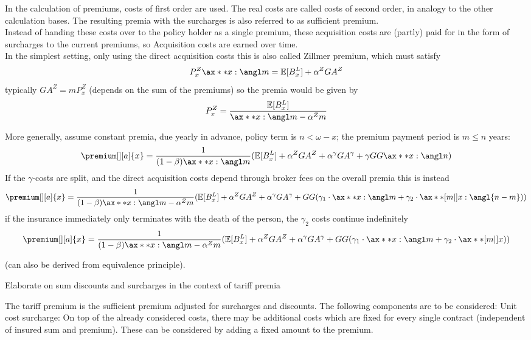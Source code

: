 \documentclass[11pt,a4paper,twoside]{article}
\begin{document}
In the calculation of premiums, costs of first order are used. The real costs are called
costs of second order, in analogy to the other calculation bases.
The resulting premia with the surcharges is also referred to as sufficient premium. \\

Instead of handing these costs over to the policy holder as a single premium, these
acquisition costs are (partly) paid for in the form of surcharges to the current premiums,
so Acquisition costs are earned over time. \\

In the simplest setting, only using the direct acquisition costs this is also called Zillmer premium,
which must satisfy
\[ P^Z_x \ax**{x: \angl m} = \mathbb{E}[B^L_x] + \alpha^Z GA^Z  \]
typically \( GA^Z = m P_x^Z \) (depends on the sum of the premiums) so the premia would be given by
\[ P^Z_x = \frac{\mathbb{E}[B^L_x]}{\ax**{x: \angl m} - \alpha^Z m} \]

More generally, assume constant premia, 
due yearly in advance, 
policy term is \( n < \omega - x\); 
the premium payment period is \( m \leq n \) years:
\[ 
\premium[][a]{x} = \frac{1}{(1 - \beta) \ax**{x: \angl m}}( \mathbb{E}[B^L_x] + \alpha^Z GA^Z + \alpha^\gamma GA^\gamma + \gamma GG \ax**{x: \angl n}) 
\]
If the \( \gamma \)-costs are split, and the direct acquisition costs depend through broker fees on the overall premia this is instead 
\[ 
\premium[][a]{x} = \frac{1}{(1 - \beta) \ax**{x: \angl m} - \alpha^Z m}( 
\mathbb{E}[B^L_x] + \alpha^Z GA^Z + \alpha^\gamma GA^\gamma + GG (\gamma_1 \cdot \ax**{x: \angl m} + \gamma_2 \cdot \ax**[m|]{x: \angl{n - m}}) )
\]
if the insurance immediately only terminates with the death of the person, the \( \gamma_2 \) costs continue indefinitely 
\[ 
\premium[][a]{x} = \frac{1}{(1 - \beta) \ax**{x: \angl m} - \alpha^Z m}( 
\mathbb{E}[B^L_x] + \alpha^Z GA^Z + \alpha^\gamma GA^\gamma + GG (\gamma_1 \cdot \ax**{x: \angl m} + \gamma_2 \cdot \ax**[m|]{x}))
\]

(can also be derived from equivalence principle).


Elaborate on sum discounts and surcharges in the context of tariff premia

The tariff premium is the sufficient premium adjusted for surcharges and discounts. The
following components are to be considered:
Unit cost surcharge: On top of the already considered costs, there may be additional
costs which are fixed for every single contract (independent of insured sum and premium).
These can be considered by adding a fixed amount to the premium.
\end{document}
